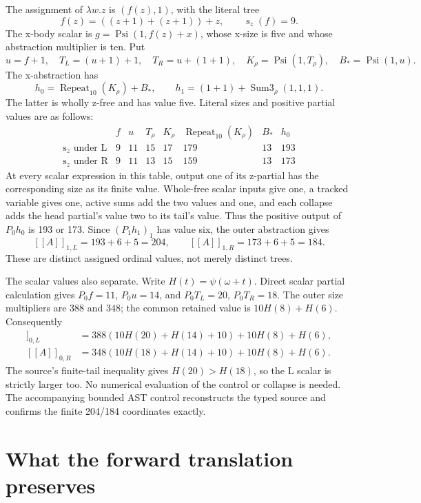 \documentclass[11pt]{article}
\newcommand{\sz}{\operatorname{s}}
\newcommand{\CP}{\operatorname{Psi}}
\newcommand{\Rep}{\operatorname{Repeat}}
\begin{document}
The assignment of $\lambda w.z$ is $(f(z),1)$, with the literal tree
\[
 f(z)=((z+1)+(z+1))+z,\qquad\sz_z(f)=9.
\]
The x-body scalar is $g=\CP(1,f(z)+x)$, whose x-size is five and
whose abstraction multiplier is ten. Put
\[
 u=f+1,\quad T_L=(u+1)+1,\quad T_R=u+(1+1),\quad
 K_\rho=\CP(1,T_\rho),\quad B_*=\CP(1,u).
\]
The x-abstraction has
\[
 h_0=\Rep_{10}(K_\rho)+B_*,\qquad
 h_1=(1+1)+\operatorname{Sum3}_\rho(1,1,1).
\]
The latter is wholly z-free and has value five. Literal sizes and
positive partial values are as follows:
\[
\begin{array}{c|rrrrrrr}
 &f&u&T_\rho&K_\rho&\Rep_{10}(K_\rho)&B_*&h_0\\\hline
 \sz_z\text{ under L}&9&11&15&17&179&13&193\\
 \sz_z\text{ under R}&9&11&13&15&159&13&173
\end{array}
\]
At every scalar expression in this table, output one of its z-partial
has the corresponding size as its finite value. Whole-free scalar
inputs give one, a tracked variable gives one, active sums add the
two values and one, and each collapse adds the head partial's value
two to its tail's value. Thus the positive output of $P_0h_0$ is
193 or 173. Since $(P_1h_1)_1$ has value six, the outer abstraction gives
\[
 \boxed{\ [\![A]\!]_{1,L}=193+6+5=204,
 \qquad [\![A]\!]_{1,R}=173+6+5=184.\ }
\]
These are distinct assigned ordinal values, not merely distinct trees.

The scalar values also separate. Write $H(t)=\psi(\omega+t)$. Direct
scalar partial calculation gives $P_0f=11$, $P_0u=14$, and
$P_0T_L=20$, $P_0T_R=18$. The outer size multipliers are 388 and 348;
the common retained value is $10H(8)+H(6)$. Consequently
\begin{align*}
 [\![A]\!]_{0,L}&=388(10H(20)+H(14)+10)+10H(8)+H(6),\\
 [\![A]\!]_{0,R}&=348(10H(18)+H(14)+10)+10H(8)+H(6).
\end{align*}
The source's finite-tail inequality gives $H(20)>H(18)$, so the L
scalar is strictly larger too. No numerical evaluation of the control
or collapse is needed. The accompanying bounded AST control reconstructs
the typed source and confirms the finite 204/184 coordinates exactly.

\section{What the forward translation preserves}
\end{document}
